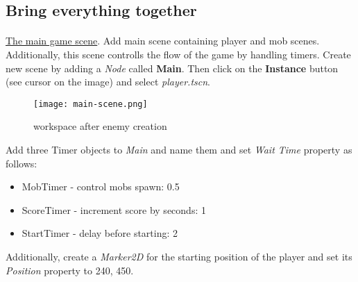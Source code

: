 \subsection{Bring everything together}
\paragraph{}
\href{https://docs.godotengine.org/en/stable/getting_started/first_2d_game/05.the_main_game_scene.html}{\color{blue}The main game scene}.
Add main scene containing player and mob scenes. Additionally, this scene controlls the flow of the game by handling timers.
Create new scene by adding a \textit{Node} called \textbf{Main}. Then click on the \textbf{Instance} button (see cursor
on the image) and select \textit{player.tscn}.
\begin{figure}[H]
    \centering
    \texttt{[image: main-scene.png]}
    \caption{workspace after enemy creation}
    \label{fig:main-scene}
\end{figure}
Add three Timer objects to \textit{Main} and name them and set \textit{Wait Time} property as follows:
\begin{itemize}
    \item MobTimer - control mobs spawn: 0.5
    \item ScoreTimer - increment score by seconds: 1
    \item StartTimer - delay before starting: 2
\end{itemize}
Additionally, create a \textit{Marker2D} for the starting position of the player and set its \textit{Position} property
to 240, 450.
